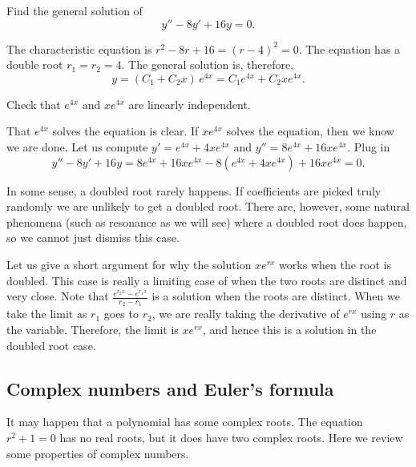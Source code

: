 \begin{example}
Find the general solution of
\begin{equation*}
y'' -8 y' + 16 y = 0 .
\end{equation*}

The characteristic equation is $r^2 - 8 r + 16 = {(r-4)}^2 = 0$.
The equation has a 
double root $r_1 = r_2 = 4$.  The general solution is, therefore,
\begin{equation*}
y = (C_1 + C_2 x)\, e^{4 x} = C_1 e^{4x} + C_2 x e^{4x} .
\end{equation*}

\begin{exercise}
Check that $e^{4x}$ and $x e^{4x}$ are linearly independent.
\end{exercise}

That $e^{4x}$ solves the equation is clear.  If $x e^{4x}$ solves the
equation, then we know we are done.  Let us compute
$y' = e^{4x} + 4xe^{4x}$ and
$y'' = 8 e^{4x} + 16xe^{4x}$.  Plug in
\begin{equation*}
y'' - 8 y' + 16 y = 
8 e^{4x} + 16xe^{4x} - 8(e^{4x} + 4xe^{4x}) + 16 xe^{4x} = 
0 .
\end{equation*}
\end{example}

In some sense, a doubled root rarely happens.  If coefficients are 
picked truly randomly we are unlikely to get a doubled root.
There are, however, some natural phenomena (such as resonance as we will see)
where a doubled root does happen, so we cannot just dismiss this case.

Let us give a short argument for why the solution $x e^{r x}$ works when the
root is doubled.  This case is really a limiting case of when
the two roots are distinct and very close.  Note that 
$\frac{e^{r_2 x} - e^{r_1 x}}{r_2 - r_1}$ is a solution when the roots are
distinct.  When we take the limit as $r_1$ goes to $r_2$, we are really
taking the
derivative of $e^{rx}$ using $r$ as the variable.  Therefore, the limit is 
$x e^{rx}$, and hence this is a solution in the doubled root case.

\subsection{Complex numbers and Euler's formula}

It may happen that a polynomial has some complex roots.  The
equation $r^2 + 1 = 0$ has no real roots, but it does have two complex roots.
Here we review some properties of complex numbers.

